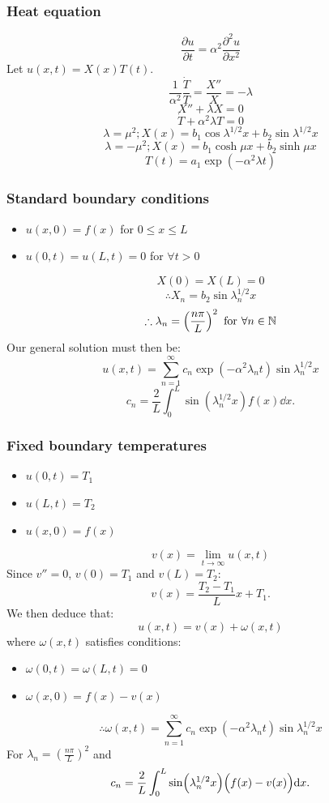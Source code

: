 \documentclass{article}
\begin{document}
\begin{multicols}{3}
\subsubsection*{Heat equation}
$$\frac{\partial u}{\partial t}=\alpha^2\frac{\partial^2 u}{\partial x^2}$$
Let $u(x,t)=X(x)T(t)$.
$$\frac{1}{\alpha^2}\frac{\dot{T}}{T}
=\frac{X''}{X}=-\lambda$$
$$X''+\lambda X=0$$
$$\dot{T}+\alpha^2\lambda T=0$$
$$\lambda=\mu^2;X(x)=b_1\cos\lambda^{1/2} x
+b_2\sin\lambda^{1/2} x$$
$$\lambda=-\mu^2;X(x)=b_1\cosh\mu x+b_2\sinh\mu x$$
$$T(t)=a_1\exp\left(-\alpha^2\lambda t\right)$$

\subsubsection*{Standard boundary conditions}
\begin{itemize}
    \item $u(x,0)=f(x)$ for $0\leq x\leq L$

    \item $u(0,t)=u(L,t)=0$ for $\forall t>0$
\end{itemize}
$$X(0)=X(L)=0$$
$$\therefore X_n=b_2\sin\lambda_n^{1/2} x$$
$$\therefore\lambda_n=\left(\frac{n\pi}{L}\right)^2
\hspace{0.05in}\text{for}\hspace{0.05in}\forall n\in\mathbb{N}$$
Our general solution must then be:
$$u(x,t)=\sum_{n=1}^{\infty}c_n\exp\left(-\alpha^2\lambda_n t\right)
\sin\lambda_n^{1/2} x$$
$$c_n=\frac{2}{L}\int_{0}^{L}\sin(\lambda_n^{1/2} x) f(x)\dd x.$$

\subsubsection*{Fixed boundary temperatures}
\begin{itemize}
    \item $u(0,t)=T_1$
    \item $u(L,t)=T_2$
    \item $u(x,0)=f(x)$
\end{itemize}
$$v(x)=\lim_{t\rightarrow\infty}u(x,t)$$
Since $v''=0$, $v(0)=T_1$ and $v(L)=T_2$:
$$v(x)=\frac{T_2-T_1}{L}x+T_1.$$
We then deduce that:
$$u(x,t)=v(x)+\omega(x,t)$$
where $\omega(x,t)$ satisfies conditions:
\begin{itemize}
    \item $\omega(0,t)=\omega(L,t)=0$
    \item $\omega(x,0)=f(x)-v(x)$
\end{itemize}
$$\therefore\omega(x,t)
=\sum_{n=1}^{\infty}c_n\exp\left(-\alpha^2\lambda_n t\right)
\sin\lambda_n^{1/2} x$$
For $\displaystyle\lambda_n=\left(\frac{n\pi}{L}\right)^2$ and
$$c_n=\frac{2}{L}\int_{0}^{L}\sin(\lambda_n^{1/2} x)\Bigl(f(x)-v(x)\Bigr)\dd x.$$


\end{multicols}
\end{document}
